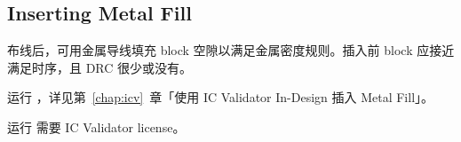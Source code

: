\subsection*{Inserting Metal Fill}

布线后，可用金属导线填充 block 空隙以满足金属密度规则。插入前 block 应接近满足时序，且 DRC 很少或没有。

运行 ，详见第~\ref{chap:icv}~章「使用 IC Validator In-Design 插入 Metal Fill」。

\begin{noteBox}
运行  需要 IC Validator license。
\end{noteBox}

